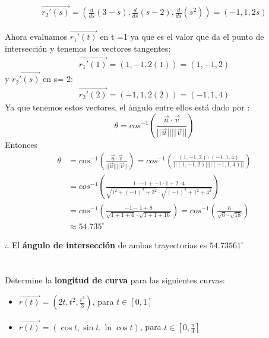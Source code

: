 \documentclass[12pt]{article}
\begin{document}
\begin{align*}
    \vec{r_2'(s)} = \left( \frac{d}{ds} (3-s),\frac{d}{ds} (s-2),\frac{d}{ds}(s^2)  \right) = (-1, 1, 2s) 
\end{align*}

Ahora evaluamos $\vec{r_1'(t)}$ en t =1 ya que es el valor que da el punto de intersección y tenemos los vectores tangentes:
\begin{align*}
    \vec{r_1'(1)} =  (1, -1, 2(1))  =(1, -1, 2)
\end{align*}
y  $\vec{r_2'(s)}$ en s= 2: 
\begin{align*}
  \vec{r_2'(2)} = (-1, 1, 2(2)) = (-1, 1, 4)
\end{align*}
Ya que tenemos estos vectores, el ángulo entre ellos está dado por :
\[
\theta = cos^{-1 }\left(\frac{\vec{u} \cdot \vec{v}}{||\vec{u}|| ||\vec{v}||}\right)
\]
Entonces
\begin{align*}
  \theta &= cos^{-1 }\left(\frac{\vec{u} \cdot \vec{v}}{||\vec{u}|| ||\vec{v}||}\right) = cos^{-1 }\left(\frac{(1, -1, 2) \cdot (-1, 1, 4)}{||(1, -1, 2)|| ||(-1, 1, 4)||}\right) \\
  &=  cos^{-1 }\left(  \frac{1 \cdot -1 + -1 \cdot 1 + 2 \cdot 4}{\sqrt{1^2 + (-1)^2 + 2^2} \cdot \sqrt{(-1)^2 + 1^2 + 4^2}} \right) \\
  &=  cos^{-1 }\left( \frac{-1  -1 + 8}{\sqrt{1 + 1 + 4} \cdot \sqrt{1 + 1 + 16}} \right)  =  cos^{-1 }\left( \frac{6}{\sqrt{6} \cdot \sqrt{18}}\right) \\
  &\approx 54.735 ^\circ 
\end{align*}

$\therefore$ El \textbf{ángulo de intersección} de ambas trayectorias es $54.73561 ^\circ$ 


\section{}
Determine la \textbf{longitud de curva} para las siguientes curvas:
\begin{itemize}[format=\textbf]

\item $\vec{r(t)}=\left(2t,t^2,\frac{t^3}{3}\right)$, para $t \in [0,1]$

\item $\vec{r(t)}=\left(\cos{t},\sin{t},\ln{\cos{t}}\right)$, para $t \in \left[0,\frac{\pi}{4}\right]$

\end{itemize}
\end{document}
